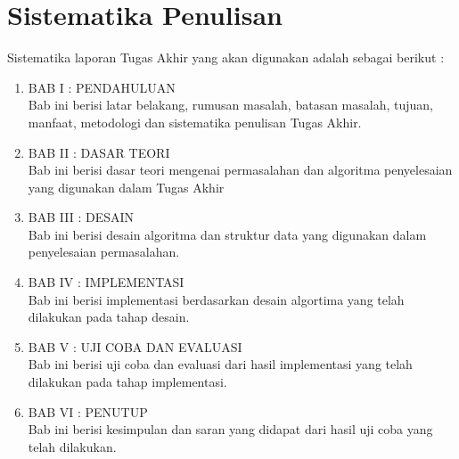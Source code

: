 \section {Sistematika Penulisan}
Sistematika laporan Tugas Akhir yang akan digunakan adalah sebagai berikut :
\begin{enumerate}
    \item BAB I : PENDAHULUAN\\
    Bab ini berisi latar belakang, rumusan masalah, batasan masalah, tujuan, manfaat, metodologi dan sistematika penulisan Tugas Akhir.
    \item BAB II : DASAR TEORI\\
    Bab ini berisi dasar teori mengenai permasalahan dan algoritma penyelesaian yang digunakan dalam Tugas Akhir
    \item BAB III : DESAIN\\
    Bab ini berisi desain algoritma dan struktur data yang digunakan dalam penyelesaian permasalahan.
    \item BAB IV : IMPLEMENTASI\\
    Bab ini berisi implementasi berdasarkan desain algortima yang telah dilakukan pada tahap desain.
    \item BAB V : UJI COBA DAN EVALUASI\\
    Bab ini berisi uji coba dan evaluasi dari hasil implementasi yang telah dilakukan pada tahap implementasi.
    \item BAB VI : PENUTUP\\
    Bab ini berisi kesimpulan dan saran yang didapat dari hasil uji coba yang telah dilakukan.
\end{enumerate}